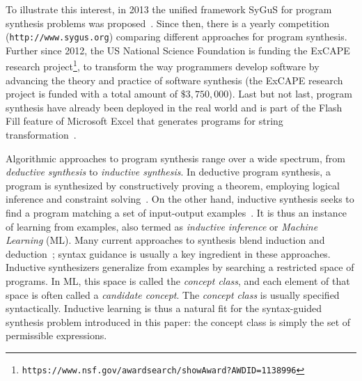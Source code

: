 \documentclass[10pt,a4paper]{paper}
\begin{document}
To illustrate this interest, in 2013 the unified framework {\sc SyGuS} for program synthesis problems was proposed~\cite{alur2013syntax}. Since then, there is a yearly competition ({\tt http://www.sygus.org}) comparing different approaches for program synthesis. Further since 2012, the {\sc US National Science Foundation} is funding the ExCAPE research project\footnote{\tt https://www.nsf.gov/awardsearch/showAward?AWD\textunderscore ID=1138996}, to transform the way programmers develop software by advancing the theory and practice of software synthesis (the ExCAPE research project is funded with a total amount of $\$3,750,000$). Last but not last, program synthesis have already been deployed in the real world and is part of the {\sc Flash Fill} feature of {\sc Microsoft Excel} that generates programs for string transformation~\cite{gulwani2011automating}.

Algorithmic approaches to program synthesis range over a wide spectrum, from {\em deductive synthesis} to {\em inductive synthesis}. In deductive program synthesis, a program is synthesized by constructively proving a theorem, employing logical inference and constraint solving~\cite{manna1986deductive}. On the other hand, inductive synthesis seeks to find a program matching a set of input-output examples~\cite{summers1977methodology,shapiro1983algorithmic}. It is thus an instance of learning from examples, also termed as {\em inductive inference} or {\em Machine Learning} (ML). Many current approaches to synthesis blend induction and deduction~\cite{seshia2015combining}; syntax guidance is usually a key ingredient in these approaches. Inductive synthesizers generalize from examples by searching a restricted space of programs. In ML, this space is called the {\em concept class}, and each element of that space is often called a {\em candidate concept}. The {\em concept class} is usually specified syntactically. Inductive learning is thus a natural fit for the syntax-guided synthesis problem introduced in this paper: the concept class is simply the set of permissible expressions.
\end{document}

